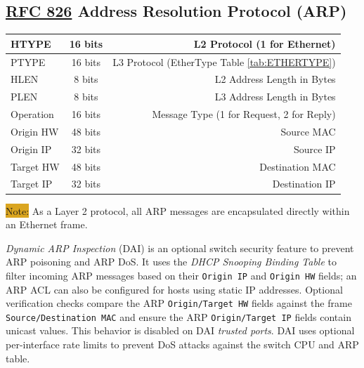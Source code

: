 \documentclass[12pt]{article}
\newcommand{\note}[1]{\colorbox{#1}{Note:}}
\newcommand{\RFC}[1]{\href{https://datatracker.ietf.org/doc/html/rfc#1}{RFC #1}}
\begin{document}
	\subsection[RFC 826 ARP]{\RFC{826} Address Resolution Protocol (ARP) \label{subsec:ARP}}
	\begin{table}[H]
	\centering
	\begin{tabular}{| l | c | r |}
	\hline
	HTYPE	& 16 bits	& L2 Protocol (1 for Ethernet)\\\hline
	PTYPE	& 16 bits	& L3 Protocol (EtherType Table \ref{tab:ETHERTYPE})\\\hline
	HLEN		& 8 bits	& L2 Address Length in Bytes\\\hline
	PLEN		& 8 bits	& L3 Address Length in Bytes\\\hline
	Operation	& 16 bits	& Message Type (1 for Request, 2 for Reply)\\\hline
	Origin HW 	& 48 bits	& Source MAC\\\hline
	Origin IP	& 32 bits	& Source IP\\\hline
	Target HW 	& 48 bits	& Destination MAC\\\hline
	Target IP	& 32 bits	& Destination IP\\\hline
	\end{tabular}\end{table}
	\note{Goldenrod} As a Layer 2 protocol, all ARP messages are encapsulated directly within an Ethernet frame.

	\textit{Dynamic ARP Inspection} (DAI) is an optional switch security feature to prevent ARP poisoning and ARP DoS. It uses the \textit{DHCP Snooping Binding Table} to filter incoming ARP messages based on their \texttt{Origin IP} and \texttt{Origin HW} fields; an ARP ACL can also be configured for hosts using static IP addresses. Optional verification checks compare the ARP \texttt{Origin/Target HW} fields against the frame \texttt{Source/Destination MAC} and ensure the ARP \texttt{Origin/Target IP} fields contain unicast values. This behavior is disabled on DAI \textit{trusted ports}. DAI uses optional per-interface rate limits to prevent DoS attacks against the switch CPU and ARP table.


\end{document}
